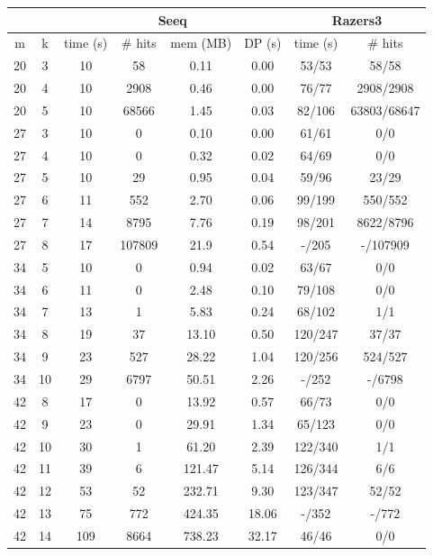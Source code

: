 \documentclass[12pt]{article}
\begin{document}
\begin{table}[h]
\centering
\begin{tabular}{c|c||c|c|c|c||c|c}
  \multicolumn{2}{c}{} & \multicolumn{4}{c}{Seeq} &
      \multicolumn{2}{c}{Razers3} \\
  \hline
  m  & k & time (s) & \# hits & mem (MB) & DP (s) & time (s) & \# hits \\
  \hline
  20 & 3  & 10  & 58     & 0.11    & 0.00 & 53/53 & 58/58 \\
  20 & 4  & 10  & 2908   & 0.46    & 0.00 & 76/77 & 2908/2908 \\
  20 & 5  & 10  & 68566  & 1.45    & 0.03 & 82/106 & 63803/68647 \\
  27 & 3  & 10  & 0      & 0.10    & 0.00 & 61/61 & 0/0 \\
  27 & 4  & 10  & 0      & 0.32    & 0.02 & 64/69 & 0/0 \\
  27 & 5  & 10  & 29     & 0.95    & 0.04 & 59/96 & 23/29 \\
  27 & 6  & 11  & 552    & 2.70    & 0.06 & 99/199 & 550/552 \\
  27 & 7  & 14  & 8795   & 7.76    & 0.19 & 98/201 & 8622/8796 \\
  27 & 8  & 17  & 107809 & 21.9    & 0.54 & -/205 & -/107909 \\
  34 & 5  & 10  & 0      & 0.94    & 0.02 & 63/67 & 0/0 \\
  34 & 6  & 11  & 0      & 2.48    & 0.10 & 79/108 & 0/0 \\
  34 & 7  & 13  & 1      & 5.83    & 0.24 & 68/102 & 1/1 \\
  34 & 8  & 19  & 37     & 13.10   & 0.50 & 120/247 & 37/37 \\
  34 & 9  & 23  & 527    & 28.22   & 1.04 & 120/256 & 524/527 \\
  34 & 10 & 29  & 6797   & 50.51   & 2.26 & -/252 & -/6798 \\
  42 & 8  & 17  & 0      & 13.92   & 0.57 & 66/73 & 0/0 \\
  42 & 9  & 23  & 0      & 29.91   & 1.34 & 65/123 & 0/0 \\
  42 & 10 & 30  & 1      & 61.20   & 2.39 & 122/340 & 1/1 \\
  42 & 11 & 39  & 6      & 121.47  & 5.14 & 126/344 & 6/6 \\
  42 & 12 & 53  & 52     & 232.71  & 9.30 & 123/347 & 52/52 \\
  42 & 13 & 75  & 772    & 424.35  & 18.06 & -/352 & -/772 \\
  42 & 14 & 109 & 8664   & 738.23  & 32.17 & 46/46 & 0/0 \\

\end{tabular}
\end{table}
\end{document}
